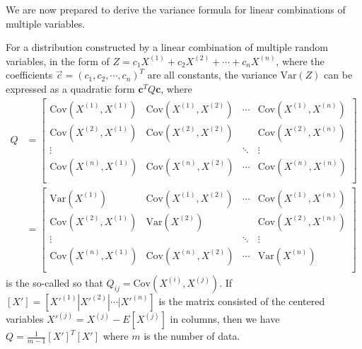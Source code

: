 We are now prepared to derive the variance formula for linear combinations of multiple variables.
\begin{proper}
\label{proper:variancemul}
For a distribution constructed by a linear combination of multiple random variables, in the form of $Z = c_1X^{(1)} + c_2X^{(2)} + \cdots + c_nX^{(n)}$, where the coefficients $\vec{c} = (c_1, c_2, \cdots, c_n)^T$ are all constants, the variance $\text{Var}(Z)$ can be expressed as a quadratic form $\textbf{c}^TQ\textbf{c}$, where
\begin{subequations}
\begin{align}
Q &=
\begin{bmatrix}
\text{Cov}(X^{(1)}, X^{(1)}) & \text{Cov}(X^{(1)}, X^{(2)}) & \cdots & \text{Cov}(X^{(1)}, X^{(n)}) \\
\text{Cov}(X^{(2)}, X^{(1)}) & \text{Cov}(X^{(2)}, X^{(2)}) & & \text{Cov}(X^{(2)}, X^{(n)}) \\
\vdots & & \ddots & \vdots \\
\text{Cov}(X^{(n)}, X^{(1)}) & \text{Cov}(X^{(n)}, X^{(2)}) & \cdots & \text{Cov}(X^{(n)}, X^{(n)}) \\
\end{bmatrix} \\
&=
\begin{bmatrix}
\text{Var}(X^{(1)}) & \text{Cov}(X^{(1)}, X^{(2)}) & \cdots & \text{Cov}(X^{(1)}, X^{(n)}) \\
\text{Cov}(X^{(2)}, X^{(1)}) & \text{Var}(X^{(2)}) & & \text{Cov}(X^{(2)}, X^{(n)}) \\
\vdots & & \ddots & \vdots \\
\text{Cov}(X^{(n)}, X^{(1)}) & \text{Cov}(X^{(n)}, X^{(2)}) & \cdots & \text{Var}(X^{(n)}) \\
\end{bmatrix} 
\end{align}    
\end{subequations}
is the so-called  so that $Q_{ij} = \text{Cov}(X^{(i)}, X^{(j)})$. If $[X'] = [X'^{(1)}|X'^{(2)}|\cdots|X'^{(n)}]$ is the matrix consisted of the centered variables $X'^{(j)} = X^{(j)} - E[X^{(j)}]$ in columns, then we have $Q = \frac{1}{m-1}[X']^T[X']$ where $m$ is the number of data.
\end{proper}
